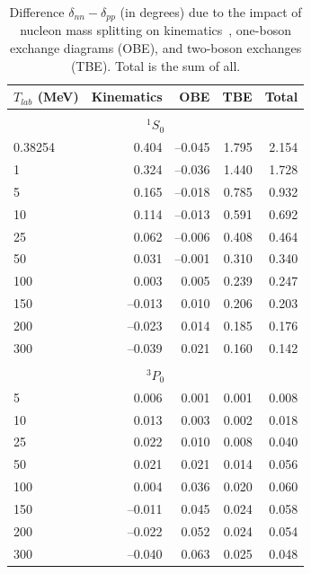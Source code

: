\begin{table}
\caption{
Difference $\delta_{nn} - \delta_{pp}$ 
(in degrees) due to the impact of
nucleon mass splitting on kinematics~\protect\cite{foot1},
one-boson exchange diagrams (OBE), and two-boson exchanges (TBE).
Total is the sum of all.}
\begin{tabular}{lrrrr}
$T_{lab}$ (MeV)
 & Kinematics
 & OBE
 & TBE
 & Total
\\
 \hline 
\hline                                                                          
\\ \multicolumn{5}{c}{$^1S_0$} \\                                               
0.38254&  0.404 & --0.045 &   1.795 &   2.154 \\
    1 &   0.324 & --0.036 &   1.440 &   1.728 \\
    5 &   0.165 & --0.018 &   0.785 &   0.932 \\
   10 &   0.114 & --0.013 &   0.591 &   0.692 \\
   25 &   0.062 & --0.006 &   0.408 &   0.464 \\
   50 &   0.031 & --0.001 &   0.310 &   0.340 \\
  100 &   0.003 &   0.005 &   0.239 &   0.247 \\
  150 & --0.013 &   0.010 &   0.206 &   0.203 \\
  200 & --0.023 &   0.014 &   0.185 &   0.176 \\
  300 & --0.039 &   0.021 &   0.160 &   0.142 \\
\hline                                                                          
\\ \multicolumn{5}{c}{$^3P_0$} \\                                               
    5 &   0.006 &   0.001 &   0.001 &   0.008 \\
   10 &   0.013 &   0.003 &   0.002 &   0.018 \\
   25 &   0.022 &   0.010 &   0.008 &   0.040 \\
   50 &   0.021 &   0.021 &   0.014 &   0.056 \\
  100 &   0.004 &   0.036 &   0.020 &   0.060 \\
  150 & --0.011 &   0.045 &   0.024 &   0.058 \\
  200 & --0.022 &   0.052 &   0.024 &   0.054 \\
  300 & --0.040 &   0.063 &   0.025 &   0.048 \\
\hline                                                                          

\end{tabular}
\end{table}
